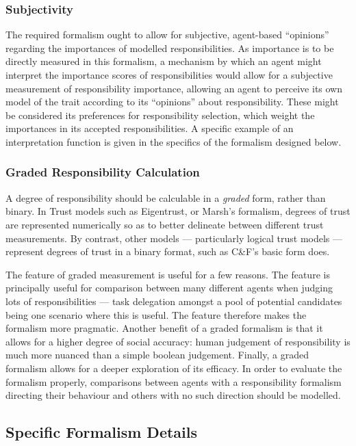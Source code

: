 \subsubsection{Subjectivity}
The required formalism ought to allow for subjective, agent-based ``opinions'' regarding the importances of modelled responsibilities. As importance is to be directly measured in this formalism, a mechanism by which an agent might interpret the importance scores of responsibilities would allow for a subjective measurement of responsibility importance, allowing an agent to perceive its own model of the trait according to its ``opinions'' about responsibility. These might be considered its preferences for responsibility selection, which weight the importances in its accepted responsibilities. A specific example of an interpretation function is given in the specifics of the formalism designed below.

\subsubsection{Graded Responsibility Calculation}
A degree of responsibility should be calculable in a \emph{graded} form, rather than binary. In Trust models such as Eigentrust, or Marsh's formalism, degrees of trust are represented numerically so as to better delineate between different trust measurements. By contrast, other models --- particularly logical trust models --- represent degrees of trust in a binary format, such as C\&F's basic form does.\par

The feature of graded measurement is useful for a few reasons. The feature is principally useful for comparison between many different agents when judging lots of responsibilities --- task delegation amongst a pool of potential candidates being one scenario where this is useful. The feature therefore makes the formalism more pragmatic. Another benefit of a graded formalism is that it allows for a higher degree of social accuracy: human judgement of responsibility is much more nuanced than a simple boolean judgement. Finally, a graded formalism allows for a deeper exploration of its efficacy. In order to evaluate the formalism properly, comparisons between agents with a responsibility formalism directing their behaviour and others with no such direction should be modelled.\par

\subsection{Specific Formalism Details}

